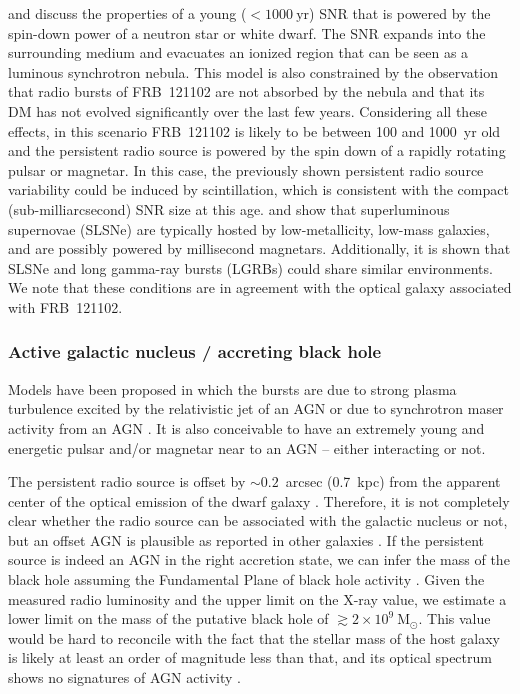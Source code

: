 \documentclass[twocolumn]{aastex61}
\newcommand{\frb}{FRB~121102\xspace}
\newcommand{\msun}{\mathrm{M_{\odot}}\xspace}
\begin{document}
\citet{mkm16} and \citet{pir16} discuss the properties of a young ($< 1000~\mathrm{yr}$) SNR that is powered by the spin-down power of a neutron star or white dwarf. The SNR expands into the surrounding medium and evacuates an ionized region that can be seen as a luminous synchrotron nebula. This model is also constrained by the observation that radio bursts of \frb are not absorbed by the nebula and that its DM has not evolved significantly over the last few years.
Considering all these effects, in this scenario \frb is likely to be between 100 and 1000~yr old and the persistent radio source is powered by the spin down of a rapidly rotating pulsar or magnetar.  In this case, the previously shown persistent radio source variability \citep[][where the higher cadence of observations allowed variability to be studied in more detail]{chatterjee2017} could be induced by scintillation, which is consistent with the compact (sub-milliarcsecond) SNR size at this age.  \citet{lunnan2014} and \citet{perley2016} show that superluminous supernovae (SLSNe) are typically hosted by low-metallicity, low-mass galaxies, and are possibly powered by millisecond magnetars. Additionally, it is shown that SLSNe and long gamma-ray bursts (LGRBs) could share similar environments. We note that these conditions are in agreement with the optical galaxy associated with \frb \citep{tendulkar2017}.

\subsubsection{Active galactic nucleus / accreting black hole}

Models have been proposed in which the bursts are due to strong plasma turbulence excited by the relativistic jet of an AGN \citep{romero2016} or due to synchrotron maser activity from an AGN \citep{ghi16}.  It is also conceivable to have an extremely young and energetic pulsar and/or magnetar near to an AGN \citep{pc15,cw16} -- either interacting or not. 

The persistent radio source is offset by $\sim 0.2$~arcsec (0.7~kpc) from the apparent center of the optical emission of the dwarf galaxy \citep{tendulkar2017}. Therefore, it is not completely clear whether the radio source can be associated with the galactic nucleus or not, but an offset AGN is plausible as reported in other galaxies \citep{barth2008}.
If the persistent source is indeed an AGN in the right accretion state, we can infer the mass of the black hole assuming the Fundamental Plane of black hole activity \citep{merloni2003,falcke2004,kording2006,plotkin2012,miller-jones2012}. Given the measured radio luminosity and the upper limit on the X-ray value, we estimate a lower limit on the mass of the putative black hole of $\gtrsim 2 \times 10^9\ \msun$. This value would be hard to reconcile with the fact that the stellar mass of the host galaxy is likely at least an order of magnitude less than that, and its optical spectrum shows no signatures of AGN activity \citep{tendulkar2017}.
\end{document}
